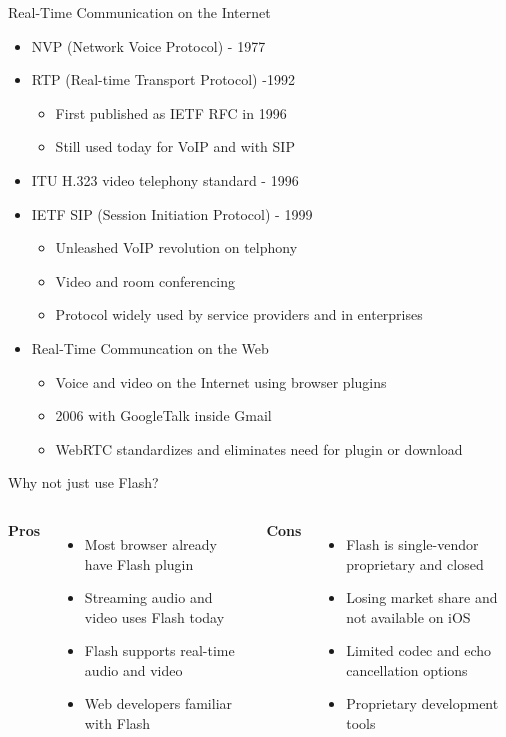 \begin{frame}{Real-Time Communication on the Internet}

\begin{itemize}
\item NVP (Network Voice Protocol) - 1977
\item RTP (Real-time Transport Protocol) -1992
\begin{itemize}
\item First published as IETF RFC in 1996
\item Still used today for VoIP and with SIP
\end{itemize}
\item ITU H.323 video telephony standard - 1996
\item IETF SIP (Session Initiation Protocol) - 1999
\begin{itemize}
\item Unleashed VoIP revolution on telphony
\item Video and room conferencing
\item Protocol widely used by service providers and in enterprises
\end{itemize}
\item Real-Time Communcation on the Web
\begin{itemize}
\item Voice and video on the Internet using browser plugins
\item 2006 with GoogleTalk inside Gmail
\item WebRTC standardizes and eliminates need for plugin or download
\end{itemize}
\end{itemize}

\end{frame}

\begin{frame}{Why not just use Flash?}
\begin{columns}
\textbf{Pros}
\begin{itemize}
\item Most browser already have Flash plugin
\item Streaming audio and video uses Flash today
\item Flash supports real-time audio and video
\item Web developers familiar with Flash
\end{itemize}
\textbf{Cons}
\begin{itemize}
\item Flash is single-vendor proprietary and closed
\item Losing market share and not available on iOS
\item Limited codec and echo cancellation options
\item Proprietary development tools
\end{itemize}
\end{columns}
\end{frame}

